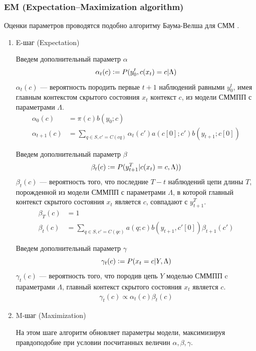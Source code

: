 \documentclass{matmex-diploma-custom}
\begin{document}
\subsubsection{EM (Expectation–Maximization algorithm)}
Оценки параметров проводятся подобно алгоритму Баума-Велша для СММ \cite{Rabiner1989}.
\begin{enumerate}
\item E-шаг (Expectation)

Введем дополнительный параметр $\alpha$
$$ \alpha_{t}(c) \mathrel{\mathop:}= P(y_{0}^{t}, c(x_{t})=c| \Lambda)$$
$\alpha_{t}(c)$ --- вероятность породить первые $t+1$ наблюдений равными $y_{0}^{t}$, имея главным контекстом  скрытого состояния $x_{t}$ контекст $ c $, из модели СММПП с параметрами $\Lambda$.
\begin{align}
\alpha_{0}(c) &= \pi(c)b(y_{0}; c) \nonumber \\
\alpha_{t+1}(c) &= \sum_{q \in S, c'=C(cq)}{\alpha_{t}(c')a(c[0];c')b(y_{t+1}; c[0])}
\label{formula:alpha}
\end{align}

Введем дополнительный параметр $\beta$
$$ \beta_{t}(c) \mathrel{\mathop:}= P(y_{t+1}^{T}| c(x_{t})=c, \Lambda))$$
$\beta_{t}(c)$ --- вероятность того, что последние $T-t$ наблюдений цепи длины $T$, порожденной из модели СММПП с параметрами $\Lambda$, в которой главный контекст скрытого состояния $x_{t}$ является $ c $, совпадают с $y_{t+1}^{T}$.
\begin{align}
\beta_{T}(c) &= 1 \nonumber \\
\beta_{t}(c) &= \sum_{q \in S, c'=C(qc)}{a(q;c)b(y_{t+1}, c'[0])\beta_{t+1}(c')}
\label{formula:beta}
\end{align}

Введем дополнительный параметр $\gamma$
$$ \gamma_{t}(c) \mathrel{\mathop:}= P(x_{t}=c|Y,\Lambda) $$ 
$\gamma_{t}(c)$ --- вероятность того, что породив цепь $Y$ моделью СММПП c параметрами $\Lambda$,
главный контекст скрытого состояния $ x_{t} $ является $c$.
\begin{align}
\gamma_{t}(c) \propto {\alpha_{t}(c)\beta_{t}(c)}
\label{formula:gamma}
\end{align}

\item M-шаг (Maximization)

На этом шаге алгоритм обновляет параметры модели, максимизируя правдоподобие при условии посчитанных величин $\alpha, \beta, \gamma$.


\end{enumerate}
\end{document}
